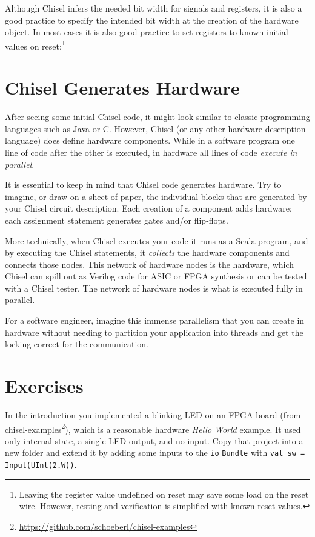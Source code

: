 \documentclass[%
    10pt,
    headinclude, footexclude,
    openright, %
    notitlepage,
    cleardoubleempty,
    headsepline,
    pointlessnumbers,
    bibtotoc, idxtotoc,
    ]{scrbook}
\newcommand{\code}[1]{{\small{\texttt{#1}}}}
\newcommand{\myref}[2]{\href{#1}{#2}}
\renewcommand{\myref}[2]{{#2}{\footnote{\url{#1}}}}
\begin{document}

\noindent Although Chisel infers the needed bit width for signals and registers, it is also a good practice
to specify the intended bit width at the creation of the hardware object.
In most cases it is also good practice to set registers to known initial values on
reset:\footnote{Leaving the register value undefined on reset may save some load on the reset
wire. However, testing and verification is simplified with known reset values.}


\section{Chisel Generates Hardware}

After seeing some initial Chisel code, it might look similar to classic programming
languages such as Java or C. However, Chisel (or any other hardware description
language) does define hardware components. While in a software program one
line of code after the other is executed, in hardware all lines of code
\emph{execute in parallel}.

It is essential to keep in mind that Chisel code generates hardware.
Try to imagine, or draw on a sheet of paper, the individual blocks that
are generated by your Chisel circuit description.
Each creation of a component adds hardware; each assignment statement
generates gates and/or flip-flops.

More technically, when Chisel executes your code it runs as a Scala program, and
by executing the Chisel statements, it \emph{collects} the hardware components
and connects those nodes. This network of hardware nodes is the hardware,
which Chisel can spill out as Verilog code for ASIC or FPGA synthesis or can be
tested with a Chisel tester.
The network of hardware nodes is what is executed fully in parallel.

For a software engineer, imagine this immense parallelism that you can
create in hardware without needing to partition your application into threads
and get the locking correct for the communication.


\section{Exercises}

In the introduction you implemented a blinking LED on an FPGA board
(from \myref{https://github.com/schoeberl/chisel-examples}{chisel-examples}), which is a reasonable
hardware \emph{Hello World} example. It used only internal state, a single LED output, and no input.
Copy that project into a new folder and extend it by adding some inputs to the \code{io} \code{Bundle}
with \code{val sw = Input(UInt(2.W))}.
\end{document}
